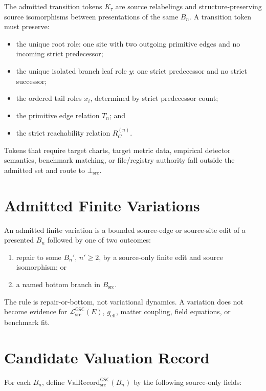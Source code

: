 \documentclass[11pt]{article}
\newcommand{\MetricData}{\mathcal{L}_{\mathrm{src}}^{\mathsf{GSC}}}
\newcommand{\ValRecord}{\mathrm{ValRecord}_{\mathrm{src}}^{\mathsf{GSC}}}
\newcommand{\BottomSrc}{\bot_{\mathrm{src}}}
\newcommand{\geff}{g_{\mathrm{eff}}}
\newcommand{\Bn}{B_n}
\begin{document}
The admitted transition tokens \(K_\tau\) are source relabelings and
structure-preserving source isomorphisms between presentations of the same
\(\Bn\). A transition token must preserve:
\begin{itemize}[leftmargin=*]
  \item the unique root role: one site with two outgoing primitive edges and no
  incoming strict predecessor;
  \item the unique isolated branch leaf role \(y\): one strict predecessor and
  no strict successor;
  \item the ordered tail roles \(x_i\), determined by strict predecessor count;
  \item the primitive edge relation \(T_n\); and
  \item the strict reachability relation \(R_C^{(n)}\).
\end{itemize}

Tokens that require target charts, target metric data, empirical detector
semantics, benchmark matching, or file/registry authority fall outside the
admitted set and route to \(\BottomSrc\).

\section{Admitted Finite Variations}
\label{admitted-finite-variations}

An admitted finite variation is a bounded source-edge or source-site edit of a
presented \(\Bn\) followed by one of two outcomes:
\begin{enumerate}[leftmargin=*]
  \item repair to some \(\Bn'\), \(n'\ge 2\), by a source-only finite edit and
  source isomorphism; or
  \item a named bottom branch in \(B_{\mathrm{src}}\).
\end{enumerate}

The rule is repair-or-bottom, not variational dynamics. A variation does not
become evidence for \(\MetricData(E)\), \(\geff\), matter coupling, field
equations, or benchmark fit.

\section{Candidate Valuation Record}
\label{candidate-valuation-record}

For each \(\Bn\), define \(\ValRecord(\Bn)\) by the following source-only
fields:
\end{document}
